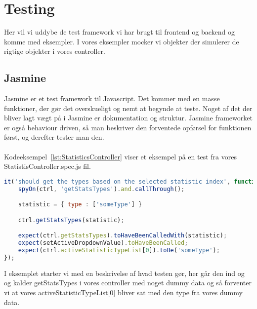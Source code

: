 \section{Testing}
Her vil vi uddybe de test framework vi har brugt til frontend og backend og komme
med eksempler. I vores eksempler mocker vi objekter der simulerer de rigtige objekter i vores controller.
\subsection{Jasmine}
Jasmine er et test framework til Javascript. Det kommer med en masse funktioner, 
der gør det overskueligt og nemt at begynde at teste.
Noget af det der bliver lagt vægt på i Jasmine er dokumentation og struktur. Jasmine frameworket er 
også behaviour driven, så man beskriver den forventede opførsel for funktionen først, og derefter tester man den.
\\\\
Kodeeksempel~\ref{lst:StatisticsController} viser et eksempel på en test fra vores StatistisController.spec.js fil.
\begin{lstlisting}[caption={StatisticsController.spec.js}, language={JavaScript}, label={lst:StatisticsController}]
it('should get the types based on the selected statistic index', function() {
    spyOn(ctrl, 'getStatsTypes').and.callThrough();

    statistic = { type : ['someType'] }

    ctrl.getStatsTypes(statistic);

    expect(ctrl.getStatsTypes).toHaveBeenCalledWith(statistic);
    expect(setActiveDropdownValue).toHaveBeenCalled;
    expect(ctrl.activeStatisticTypeList[0]).toBe('someType');
});
\end{lstlisting}
I eksemplet starter vi med en beskrivelse af hvad testen gør, her går den ind og og kalder getStatsTypes i vores controller
med noget dummy data og så forventer vi at vores activeStatisticTypeList[0] bliver sat med den type fra vores dummy data.

